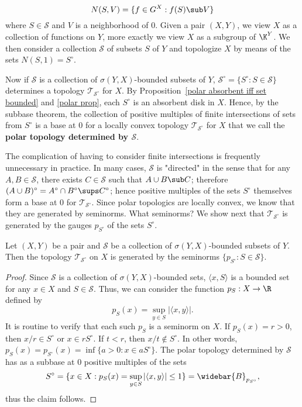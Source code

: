 \[N(S,V)=\{f\in G^X:f(S)\sub V\}\]
where $S\in\mathcal{S}$ and $V$ is a neighborhood of $0$. Given a pair $(X,Y)$, we view $X$ as a collection of functions on $Y$, more exactly we view $X$ as a subgroup of $\K^Y$. We then consider a collection $\mathcal{S}$ of subsets $S$ of $Y$ and topologize $X$ by means of the sets $N(S,1)=S^\circ$.\par
Now if $\mathcal{S}$ is a collection of $\sigma(Y,X)$-bounded subsets of $Y$, $\mathcal{S}^\circ=\{S^\circ:S\in\mathcal{S}\}$ determines a topology $\mathcal{T}_\mathcal{S^\circ}$ for $X$. By Proposition~\ref{polar absorbent iff set bounded} and \ref{polar prop}, each $S^\circ$ is an absorbent disk in $X$. Hence, by the subbase theorem, the collection of positive multiples of finite intersections of sets from $S^\circ$ is a base at $0$ for a locally convex topology $\mathcal{T}_{\mathcal{S}^\circ}$ for $X$ that we call the \textbf{polar topology determined by $\bm{\mathcal{S}}$}.\par
The complication of having to consider finite intersections is frequently unnecessary in practice. In many cases, $\mathcal{S}$ is "directed" in the sense that for any $A,B\in\mathcal{S}$, there exists $C\in\mathcal{S}$ such that $A\cup B\sub C$; therefore $(A\cup B)^\circ=A^\circ\cap B^\circ\sups C^\circ$; hence positive multiples of the sets $S^\circ$ themselves form a base at $0$ for $\mathcal{T}_{\mathcal{S}^\circ}$. Since polar topologics are locally convex, we know that they are generated by seminorms. What seminorms? We show next that $\mathcal{T}_{\mathcal{S}^\circ}$ is generated by the gauges $p_{S^\circ}$ of the sets $S^\circ$.
\begin{proposition}
Let $(X,Y)$ be a pair and $\mathcal{S}$ be a collection of $\sigma(Y,X)$-bounded subsets of $Y$. Then the  topology $\mathcal{T}_{\mathcal{S}^\circ}$ on $X$ is generated by the seminorms $\{p_{S^\circ}:S\in\mathcal{S}\}$.
\end{proposition}
\begin{proof}
Since $\mathcal{S}$ is a collection of $\sigma(Y,X)$-bounded sets, $\langle x,S\rangle$ is a bounded set for any $x\in X$ and $S\in\mathcal{S}$. Thus, we can consider the function $p_S:X\to\R$ defined by
\[p_S(x)=\sup_{y\in S}|\langle x,y\rangle|.\]
It is routine to verify that each such $p_S$ is a seminorm on $X$. If $p_S(x)=r>0$, then $x/r\in S^\circ$ or $x\in rS^\circ$. If $t<r$, then $x/t\notin S^\circ$. In other words, $p_S(x)=p_{S^\circ}(x)=\inf\{a>0:x\in aS^\circ\}$. The polar topology determined by $\mathcal{S}$ has as a subbase at $0$ positive multiples of the sets
\[S^\circ=\{x\in X:p_S(x)=\sup_{y\in S}|\langle x,y\rangle|\leq 1\}=\widebar{B}_{p_{S^\circ}},\]
thus the claim follows.
\end{proof}
